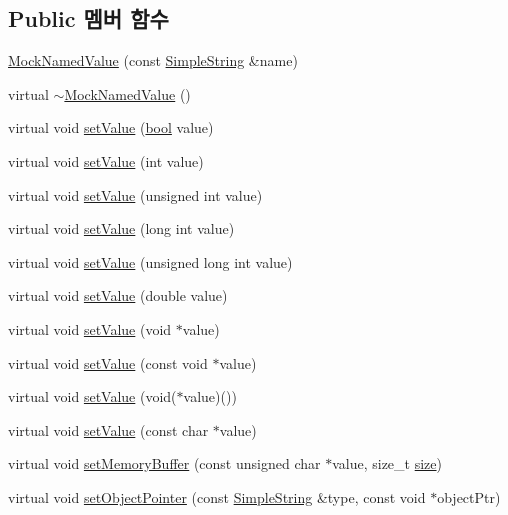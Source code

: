 \subsection*{Public 멤버 함수}
\begin{DoxyCompactItemize}
\item 
\hyperlink{class_mock_named_value_aad9cd51dc29ebc2f424e7574d205ab4f}{Mock\+Named\+Value} (const \hyperlink{class_simple_string}{Simple\+String} \&name)
\item 
virtual \hyperlink{class_mock_named_value_a122052c76a33d095a1ebd7998abccad9}{$\sim$\+Mock\+Named\+Value} ()
\item 
virtual void \hyperlink{class_mock_named_value_ae803b3348fa7076308d852bbdeea0d74}{set\+Value} (\hyperlink{avb__gptp_8h_af6a258d8f3ee5206d682d799316314b1}{bool} value)
\item 
virtual void \hyperlink{class_mock_named_value_a23d79e21b8ed72e19278ca31d47b8c87}{set\+Value} (int value)
\item 
virtual void \hyperlink{class_mock_named_value_ae7edcc0e8f39abf14760f786f679e267}{set\+Value} (unsigned int value)
\item 
virtual void \hyperlink{class_mock_named_value_a219051cd58fc476fb523917951ea2dbc}{set\+Value} (long int value)
\item 
virtual void \hyperlink{class_mock_named_value_aabf6703752baf0428af50c510dba08e1}{set\+Value} (unsigned long int value)
\item 
virtual void \hyperlink{class_mock_named_value_a1a31743bc7def7cf7fdad044c84d9268}{set\+Value} (double value)
\item 
virtual void \hyperlink{class_mock_named_value_a07b7cbbed6af178e5979a7347472a483}{set\+Value} (void $\ast$value)
\item 
virtual void \hyperlink{class_mock_named_value_a65bd35656fedd840347291be97187272}{set\+Value} (const void $\ast$value)
\item 
virtual void \hyperlink{class_mock_named_value_aad403084582707f858d991dd96d005c5}{set\+Value} (void($\ast$value)())
\item 
virtual void \hyperlink{class_mock_named_value_a4576bd0dc9301755fe5ddb96b28785f7}{set\+Value} (const char $\ast$value)
\item 
virtual void \hyperlink{class_mock_named_value_aa64f3137427c5e0eadf4eac48fa12929}{set\+Memory\+Buffer} (const unsigned char $\ast$value, size\+\_\+t \hyperlink{gst__avb__playbin_8c_a439227feff9d7f55384e8780cfc2eb82}{size})
\item 
virtual void \hyperlink{class_mock_named_value_afb0af4eeafa2323ab0de8212c46a50d7}{set\+Object\+Pointer} (const \hyperlink{class_simple_string}{Simple\+String} \&type, const void $\ast$object\+Ptr)

\end{DoxyCompactItemize}

